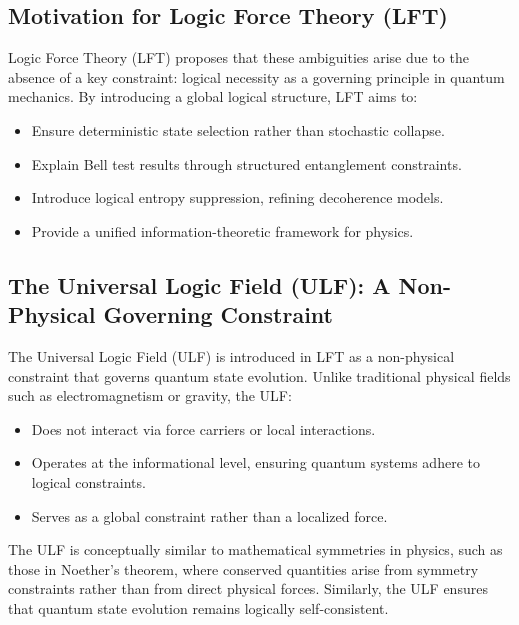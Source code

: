 \subsection{Motivation for Logic Force Theory (LFT)}
Logic Force Theory (LFT) proposes that these ambiguities arise due to the absence of a key constraint: logical necessity as a governing principle in quantum mechanics. By introducing a global logical structure, LFT aims to:
\begin{itemize}
    \item Ensure deterministic state selection rather than stochastic collapse.
    \item Explain Bell test results through structured entanglement constraints.
    \item Introduce logical entropy suppression, refining decoherence models.
    \item Provide a unified information-theoretic framework for physics.
\end{itemize}

\subsection{The Universal Logic Field (ULF): A Non-Physical Governing Constraint}
The Universal Logic Field (ULF) is introduced in LFT as a non-physical constraint that governs quantum state evolution. Unlike traditional physical fields such as electromagnetism or gravity, the ULF:
\begin{itemize}
    \item Does not interact via force carriers or local interactions.
    \item Operates at the informational level, ensuring quantum systems adhere to logical constraints.
    \item Serves as a global constraint rather than a localized force.
\end{itemize}
The ULF is conceptually similar to mathematical symmetries in physics, such as those in Noether’s theorem, where conserved quantities arise from symmetry constraints rather than from direct physical forces. Similarly, the ULF ensures that quantum state evolution remains logically self-consistent.

